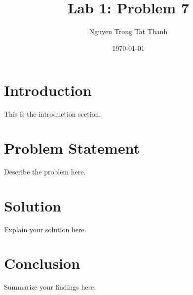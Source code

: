 \documentclass[100pt]{article}
\title{Lab 1: Problem 7}
\author{Nguyen Trong Tat Thanh}
\date{\today}
\begin{document}
\maketitle

\section{Introduction}
This is the introduction section.

\section{Problem Statement}
Describe the problem here.

\section{Solution}
Explain your solution here.

\section{Conclusion}
Summarize your findings here.
\end{document}
